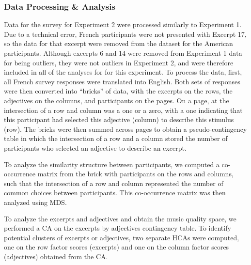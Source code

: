 \documentclass[
  english,
  man,floatsintext]{apa6}
\begin{document}
\hypertarget{data-processing-analysis}{%
\subsubsection{Data Processing \& Analysis}\label{data-processing-analysis}}

Data for the survey for Experiment 2 were processed similarly to Experiment 1. Due to a technical error, French participants were not presented with Excerpt 17, so the data for that excerpt were removed from the dataset for the American participants. Although excerpts 6 and 14 were removed from Experiment 1 data for being outliers, they were not outliers in Experiment 2, and were therefore included in all of the analyses for for this experiment. To process the data, first, all French survey responses were translated into English. Both sets of responses were then converted into ``bricks'' of data, with the excerpts on the rows, the adjectives on the columns, and participants on the pages. On a page, at the intersection of a row and column was a one or a zero, with a one indicating that this participant had selected this adjective (column) to describe this stimulus (row). The bricks were then summed across pages to obtain a pseudo-contingency table in which the intersection of a row and a column stored the number of participants who selected an adjective to describe an excerpt.

To analyze the similarity structure between participants, we computed a co-occurrence matrix from the brick with participants on the rows and columns, such that the intersection of a row and column represented the number of common choices between participants. This co-occurrence matrix was then analyzed using MDS.

To analyze the excerpts and adjectives and obtain the music quality space, we performed a CA on the excerpts by adjectives contingency table. To identify potential clusters of excerpts or adjectives, two separate HCAs were computed, one on the row factor scores (excerpts) and one on the column factor scores (adjectives) obtained from the CA.
\end{document}
